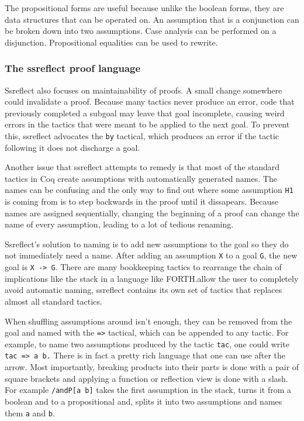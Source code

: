 \documentclass[english, 12pt, a4paper, sci, a-1b, online]{aaltothesis}
\newcommand\icoq[1]{\texttt{#1}}
\begin{document}
The propositional forms are useful because unlike the boolean forms, they are data structures that can be operated on. An assumption that is a conjunction can be broken down into two assumptions. Case analysis can be performed on a disjunction. Propositional equalities can be used to rewrite.

\subsubsection{The ssreflect proof language}

Ssreflect also focuses on maintainability of proofs. A small change somewhere could invalidate a proof. Because many tactics never produce an error, code that previously completed a subgoal may leave that goal incomplete, causing weird errors in the tactics that were meant to be applied to the next goal. To prevent this, ssreflect advocates the \icoq{by} tactical, which produces an error if the tactic following it does not discharge a goal.

Another issue that ssreflect attempts to remedy is that most of the standard tactics in Coq create assumptions with automatically generated names. The names can be confusing and the only way to find out where some assumption \icoq{H1} is coming from is to step backwards in the proof until it dissapears. Because names are assigned sequentially, changing the beginning of a proof can change the name of every assumption, leading to a lot of tedious renaming.

Ssreflect's solution to naming is to add new assumptions to the goal so they do not immediately need a name. After adding an assumption \icoq{X} to a goal \icoq{G}, the new goal is \icoq{X -> G}. There are many bookkeeping tactics to rearrange the chain of implications like the stack in a language like FORTH.\@To allow the user to completely avoid automatic naming, ssreflect contains its own set of tactics that replaces almost all standard tactics.

When shuffling assumptions around isn't enough, they can be removed from the goal and named with the \icoq{=>} tactical, which can be appended to any tactic. For example, to name two assumptions produced by the tactic \icoq{tac}, one could write \icoq{tac => a b.} There is in fact a pretty rich language that one can use after the arrow. Most importantly, breaking products into their parts is done with a pair of square brackets and applying a function or reflection view is done with a slash. For example \icoq{/andP[a b]} takes the first assumption in the stack, turns it from a boolean and to a propositional and, splits it into two assumptions and names them \icoq{a} and \icoq{b}.
\end{document}
